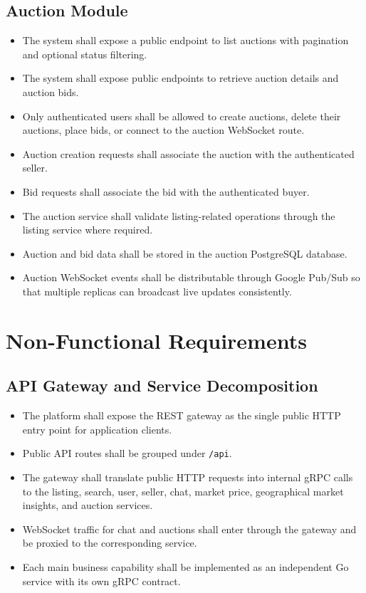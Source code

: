 \subsection{Auction Module}

\begin{itemize}
    \item The system shall expose a public endpoint to list auctions with pagination and optional status filtering.
    \item The system shall expose public endpoints to retrieve auction details and auction bids.
    \item Only authenticated users shall be allowed to create auctions, delete their auctions, place bids, or connect to the auction WebSocket route.
    \item Auction creation requests shall associate the auction with the authenticated seller.
    \item Bid requests shall associate the bid with the authenticated buyer.
    \item The auction service shall validate listing-related operations through the listing service where required.
    \item Auction and bid data shall be stored in the auction PostgreSQL database.
    \item Auction WebSocket events shall be distributable through Google Pub/Sub so that multiple replicas can broadcast live updates consistently.
\end{itemize}

\section{Non-Functional Requirements}

\subsection{API Gateway and Service Decomposition}

\begin{itemize}
    \item The platform shall expose the REST gateway as the single public HTTP entry point for application clients.
    \item Public API routes shall be grouped under \texttt{/api}.
    \item The gateway shall translate public HTTP requests into internal gRPC calls to the listing, search, user, seller, chat, market price, geographical market insights, and auction services.
    \item WebSocket traffic for chat and auctions shall enter through the gateway and be proxied to the corresponding service.
    \item Each main business capability shall be implemented as an independent Go service with its own gRPC contract.
\end{itemize}

